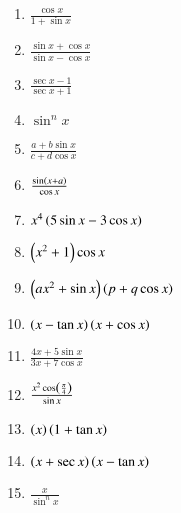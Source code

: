\begin{enumerate}[label=\arabic*.,ref=\thesubsection.\theenumi]
\begin{enumerate}[label=(\roman*)]
\item  $\frac{\cos x}{1+\sin x}$
\item  $\frac{\sin x + \cos x}{\sin x - \cos x}$
\item  $\frac{\sec x - 1}{\sec x + 1}$
\item  $\sin^n x$
\item  $\frac{a+b\sin x}{c+d\cos x}$
\item  $\frac{\sin\left(x+ a\right)}{\cos x}$
\item  $x^4\left(5\sin x - 3 \cos x\right)$
\item  $\left(x^2+1\right)\cos x$
\item  $\left(ax^2+\sin x\right)\left(p +q\cos x\right)$
\item  $\left(x-\tan x\right)\left(x +\cos x\right)$
\item  $\frac{4x+5\sin x}{3x+7\cos x}$
\item  $\frac{x^2\cos \left(\frac{\pi}{4}\right)}{\sin x}$
\item  $\left(x\right)\left(1+\tan x\right)$
\item  $\left(x+\sec x\right)\left(x -\tan x\right)$
\item  $\frac{x}{\sin^n x}$
%
\end{enumerate}

\end{enumerate}
